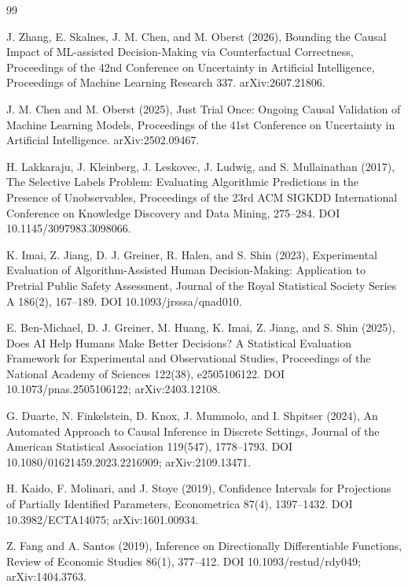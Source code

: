 \documentclass{article}
\begin{document}
\begin{thebibliography}{99}

   J. Zhang, E. Skalnes, J. M. Chen, and M. Oberst (2026), Bounding the Causal Impact of ML-assisted Decision-Making via Counterfactual Correctness, Proceedings of the 42nd Conference on Uncertainty in Artificial Intelligence, Proceedings of Machine Learning Research 337. arXiv:2607.21806.

   J. M. Chen and M. Oberst (2025), Just Trial Once: Ongoing Causal Validation of Machine Learning Models, Proceedings of the 41st Conference on Uncertainty in Artificial Intelligence. arXiv:2502.09467.

   H. Lakkaraju, J. Kleinberg, J. Leskovec, J. Ludwig, and S. Mullainathan (2017), The Selective Labels Problem: Evaluating Algorithmic Predictions in the Presence of Unobservables, Proceedings of the 23rd ACM SIGKDD International Conference on Knowledge Discovery and Data Mining, 275--284. DOI 10.1145/3097983.3098066.

   K. Imai, Z. Jiang, D. J. Greiner, R. Halen, and S. Shin (2023), Experimental Evaluation of Algorithm-Assisted Human Decision-Making: Application to Pretrial Public Safety Assessment, Journal of the Royal Statistical Society Series A 186(2), 167--189. DOI 10.1093/jrsssa/qnad010.

   E. Ben-Michael, D. J. Greiner, M. Huang, K. Imai, Z. Jiang, and S. Shin (2025), Does AI Help Humans Make Better Decisions? A Statistical Evaluation Framework for Experimental and Observational Studies, Proceedings of the National Academy of Sciences 122(38), e2505106122. DOI 10.1073/pnas.2505106122; arXiv:2403.12108.

   G. Duarte, N. Finkelstein, D. Knox, J. Mummolo, and I. Shpitser (2024), An Automated Approach to Causal Inference in Discrete Settings, Journal of the American Statistical Association 119(547), 1778--1793. DOI 10.1080/01621459.2023.2216909; arXiv:2109.13471.

   H. Kaido, F. Molinari, and J. Stoye (2019), Confidence Intervals for Projections of Partially Identified Parameters, Econometrica 87(4), 1397--1432. DOI 10.3982/ECTA14075; arXiv:1601.00934.

   Z. Fang and A. Santos (2019), Inference on Directionally Differentiable Functions, Review of Economic Studies 86(1), 377--412. DOI 10.1093/restud/rdy049; arXiv:1404.3763.


\end{thebibliography}
\end{document}
